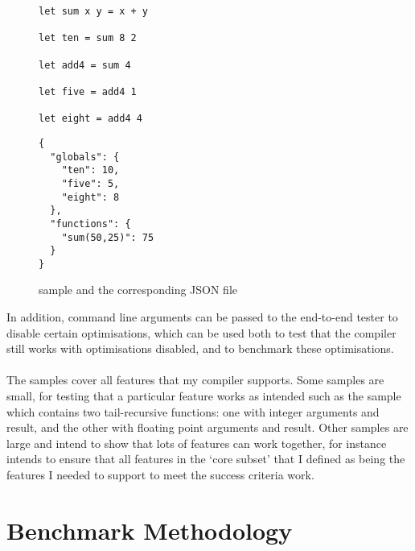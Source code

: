 \begin{figure}[h]
	\begin{minipage}[t]{0.5\linewidth}
		\begin{verbatim}
let sum x y = x + y

let ten = sum 8 2

let add4 = sum 4

let five = add4 1

let eight = add4 4
		\end{verbatim}
	\end{minipage}
	\begin{minipage}[t]{0.5\linewidth}
		\begin{verbatim}
{
  "globals": {
    "ten": 10,
    "five": 5,
    "eight": 8
  },
  "functions": {
    "sum(50,25)": 75
  }
}
		\end{verbatim}
	\end{minipage}
	\caption{ sample and the corresponding JSON file}
	\label{fig:sample}
\end{figure}
In addition, command line arguments can be passed to the end-to-end tester to disable certain optimisations, which can be used both to test that the compiler still works with optimisations disabled, and to benchmark these optimisations.
\\\\
The samples cover all features that my compiler supports. Some samples are small, for testing that a particular feature works as intended such as the  sample which contains two tail-recursive functions: one with integer arguments and result, and the other with floating point arguments and result. Other samples are large and intend to show that lots of features can work together, for instance  intends to ensure that all features in the `core subset' that I defined as being the features I needed to support to meet the success criteria work.

\section{Benchmark Methodology}

